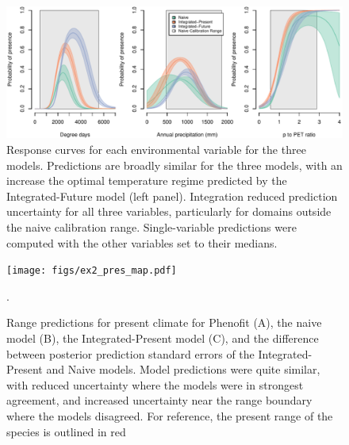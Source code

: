 \documentclass[11pt]{article}
\begin{document}
\begin{figure}[t]
	\includegraphics[width=6.5in]{figs/ex2_response.pdf}
	\caption{Response curves for each environmental variable for the three models.
	Predictions are broadly similar for the three models, with an increase the optimal temperature regime predicted by the Integrated-Future model (left panel).
	Integration reduced prediction uncertainty for all three variables, particularly for domains outside the naive calibration range.
	Single-variable predictions were computed with the other variables set to their medians.}
	\label{fig:ex2_response}
\end{figure}

\begin{figure}[t]
\texttt{[image: figs/ex2\_pres\_map.pdf]}
\caption{Range predictions for present climate for Phenofit (A), the naive model (B), the Integrated-Present model (C), and the difference between posterior prediction standard errors of the Integrated-Present and Naive models.
Model predictions were quite similar, with reduced uncertainty where the models were in strongest agreement, and increased uncertainty near the range boundary where the models disagreed.
For reference, the present range of the species is outlined in red \citep{Little1971}}.
\label{fig:ex2_map_pres}
\end{figure}

\end{document}
